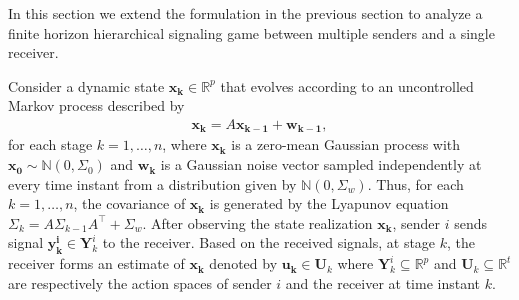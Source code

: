 \documentclass[12pt,journal,onecolumn]{IEEEtran}
\begin{document}
In this section we extend the formulation in the previous section to analyze a finite horizon hierarchical signaling game between multiple senders and a single receiver. 

Consider a dynamic state $\boldsymbol{x_{k}}\in\mathbb{R}^p$ that evolves according to an uncontrolled Markov process described by
\begin{align}
\boldsymbol{x_{k}}=A\boldsymbol{x_{k-1}}+\boldsymbol{w_{k-1}},
\end{align}
for each stage $k=1,\hdots,n$, where $\boldsymbol{x_k}$ is a zero-mean Gaussian process with $\boldsymbol{x_0}\sim \mathbb{N}(0,\Sigma_0)$ and $\boldsymbol{w_{k}}$ is a Gaussian noise vector sampled independently at every time instant from a distribution given by $\mathbb{N}(0,\Sigma_w)$. Thus, for each $k=1,\hdots,n$, the covariance of $\boldsymbol{x_k}$ is generated by the Lyapunov equation $\Sigma_k=A\Sigma_{k-1}A^\top+\Sigma_w$. After observing the state realization $ \boldsymbol{x_k}$, sender $i$ sends signal $ \boldsymbol{y^i_{k}}\in\boldsymbol{Y}_k^{i}$ to the receiver. Based on the received signals, at stage $k$, the receiver forms an estimate of $\boldsymbol{x_k}$ denoted by $\boldsymbol{u_k}\in \boldsymbol{U}_k$ where $\boldsymbol{Y}_k^{i}\subseteq \mathbb{R}^p$ and  $\boldsymbol{U}_k\subseteq \mathbb{R}^t$ are respectively the action spaces of sender $i$ and the receiver at time instant $k$.  
\end{document}
